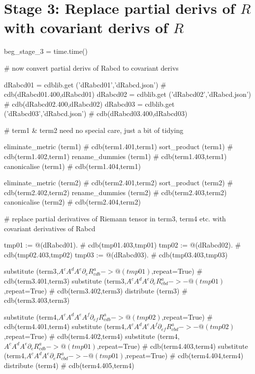 \documentclass[12pt]{cdblatex}
\begin{document}
\clearpage

\section*{Stage 3: Replace partial derivs of $R$ with covariant derivs of $R$}

\begin{cadabra}
   beg_stage_3 = time.time()

   # now convert partial derivs of Rabcd to covariant derivs

   dRabcd01 = cdblib.get ('dRabcd01','dRabcd.json')  # cdb(dRabcd01.400,dRabcd01)
   dRabcd02 = cdblib.get ('dRabcd02','dRabcd.json')  # cdb(dRabcd02.400,dRabcd02)
   dRabcd03 = cdblib.get ('dRabcd03','dRabcd.json')  # cdb(dRabcd03.400,dRabcd03)

   # term1 & term2 need no special care, just a bit of tidying

   eliminate_metric (term1)   # cdb(term1.401,term1)
   sort_product     (term1)   # cdb(term1.402,term1)
   rename_dummies   (term1)   # cdb(term1.403,term1)
   canonicalise     (term1)   # cdb(term1.404,term1)

   eliminate_metric (term2)   # cdb(term2.401,term2)
   sort_product     (term2)   # cdb(term2.402,term2)
   rename_dummies   (term2)   # cdb(term2.403,term2)
   canonicalise     (term2)   # cdb(term2.404,term2)

   # replace partial derivatives of Riemann tensor in term3, term4 etc. with covariant derivatives of Rabcd

   tmp01 := @(dRabcd01).      # cdb(tmp01.403,tmp01)
   tmp02 := @(dRabcd02).      # cdb(tmp02.403,tmp02)
   tmp03 := @(dRabcd03).      # cdb(tmp03.403,tmp03)

   substitute (term3,$A^{c}A^{d}A^{e}\partial_{e}{R^{a}_{c d b}} ->   @(tmp01)$,repeat=True)         # cdb(term3.401,term3)
   substitute (term3,$A^{c}A^{d}A^{e}\partial_{e}{R^{a}_{c b d}} -> - @(tmp01)$,repeat=True)         # cdb(term3.402,term3)
   distribute (term3)                                                                                # cdb(term3.403,term3)

   substitute (term4,$A^{c}A^{d}A^{e}A^{f}\partial_{e f}{R^{a}_{c d b}} ->   @(tmp02)$,repeat=True)  # cdb(term4.401,term4)
   substitute (term4,$A^{c}A^{d}A^{e}A^{f}\partial_{e f}{R^{a}_{c b d}} -> - @(tmp02)$,repeat=True)  # cdb(term4.402,term4)
   substitute (term4,$A^{c}A^{d}A^{e}\partial_{e}{R^{a}_{c d b}} ->   @(tmp01)$,repeat=True)         # cdb(term4.403,term4)
   substitute (term4,$A^{c}A^{d}A^{e}\partial_{e}{R^{a}_{c b d}} -> - @(tmp01)$,repeat=True)         # cdb(term4.404,term4)
   distribute (term4)                                                                                # cdb(term4.405,term4)


\end{cadabra}
\end{document}
